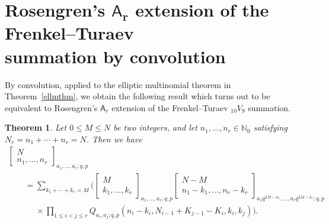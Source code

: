 \documentclass[pdftex]{sigma}
\numberwithin{equation}{section}
\newtheorem{Theorem}{Theorem}[section]
\theoremstyle{definition}
\newcommand{\N}{\mathbb N}
\begin{document}
\section[Rosengren's A\_r extension of the Frenkel--Turaev summation by convolution]{Rosengren's $\boldsymbol{\mathsf A_r}$ extension of the Frenkel--Turaev\\ summation by convolution}\label{sec:conv}

By convolution, applied to the elliptic multinomial theorem
in Theorem~\ref{ellmthm}, we obtain the following result
which turns out to be equivalent to Rosengren's $\mathsf A_r$ extension of
the Frenkel--Turaev $_{10}V_9$ summation.
\begin{Theorem}\label{thm:cf-Ar-FT}
Let $0\le M\le N$ be two integers, and let $n_1,\dots,n_r\in\N_0$
satisfying $N_r=n_1+\cdots+n_r=N$. Then we have
\begin{gather}
\begin{bmatrix}N\\n_1,\dots,n_r\end{bmatrix}_{a_1,\dots,a_r;q,p}\nonumber\\
\qquad =\sum_{k_1+\cdots+k_r=M}\bigg(
 \begin{bmatrix}M\\k_1,\dots,k_r\end{bmatrix}_{a_1,\dots,a_r;q,p}
\begin{bmatrix}N-M\\n_1-k_1,\dots,n_r-k_r\end{bmatrix}_{a_1q^{2M-k_1},\dots,a_rq^{2M-k_r};q,p}\nonumber\\
\phantom{\qquad=}{}\times\prod_{1\le i<j\le r}Q_{a_i,a_j;q,p}
(n_i-k_i,N_{i-1}+K_{j-1}-K_i,k_i,k_j)\bigg).\label{eq:cf-Ar-FT}
\end{gather}
\end{Theorem}
\end{document}

